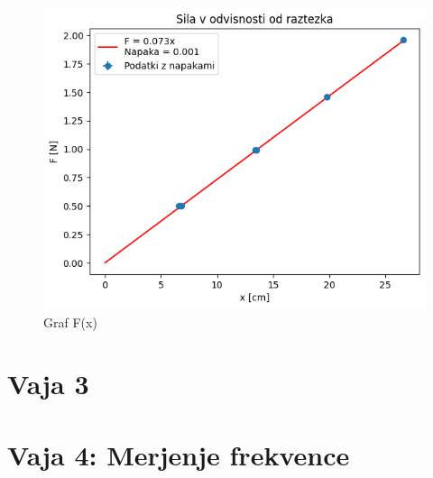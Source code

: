 \documentclass{report}
\begin{document}
\begin{figure}[H]
  \caption{Graf F(x)}
  \includegraphics[width=\textwidth]{graf}
\end{figure}

\chapter{Vaja 3}


\chapter{Vaja 4: Merjenje frekvence}
\end{document}
